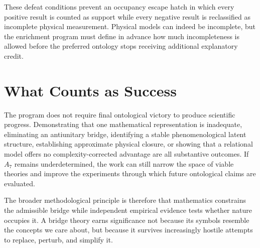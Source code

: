 These defeat conditions prevent an occupancy escape hatch in which every positive result is counted as support while every negative result is reclassified as incomplete physical measurement. Physical models can indeed be incomplete, but the enrichment program must define in advance how much incompleteness is allowed before the preferred ontology stops receiving additional explanatory credit.

\section{What Counts as Success}

The program does not require final ontological victory to produce scientific progress. Demonstrating that one mathematical representation is inadequate, eliminating an antiunitary bridge, identifying a stable phenomenological latent structure, establishing approximate physical closure, or showing that a relational model offers no complexity-corrected advantage are all substantive outcomes. If $A_7$ remains underdetermined, the work can still narrow the space of viable theories and improve the experiments through which future ontological claims are evaluated.

The broader methodological principle is therefore that mathematics constrains the admissible bridge while independent empirical evidence tests whether nature occupies it. A bridge theory earns significance not because its symbols resemble the concepts we care about, but because it survives increasingly hostile attempts to replace, perturb, and simplify it.
